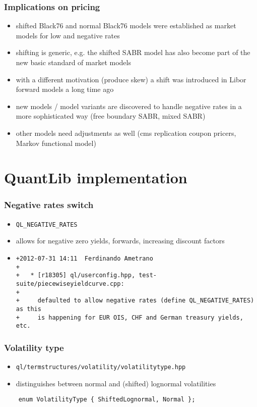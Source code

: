 \documentclass{beamer}
\begin{document}
\begin{frame}[fragile]
\frametitle{Implications on pricing}
\begin{itemize}
\item shifted Black76 and normal Black76 models were established as market models for low and negative rates
\item shifting is generic, e.g. the shifted SABR model has also become part of the new basic standard of market models
\item with a different motivation (produce skew) a shift was introduced in Libor forward models a long time ago
\item new models / model variants are discovered to handle negative rates in a more sophisticated way (free boundary SABR, mixed SABR)
\item other models need adjustments as well (cms replication coupon pricers, Markov functional model)
\end{itemize}
\end{frame}

\section{QuantLib implementation}

\begin{frame}[fragile]
\frametitle{Negative rates switch}
\begin{itemize}
\item \verb+QL_NEGATIVE_RATES+
\item allows for negative zero yields, forwards, increasing discount factors
\item \scriptsize \begin{verbatim}
+2012-07-31 14:11  Ferdinando Ametrano
+
+	* [r18305] ql/userconfig.hpp, test-suite/piecewiseyieldcurve.cpp:
+
+     defaulted to allow negative rates (define QL_NEGATIVE_RATES) as this
+     is happening for EUR OIS, CHF and German treasury yields, etc.
\end{verbatim}
\end{itemize}
\end{frame}


\begin{frame}[fragile]
\frametitle{Volatility type}
\begin{itemize}
\item \verb+ql/termstructures/volatility/volatilitytype.hpp+
\item distinguishes between normal and (shifted) lognormal volatilities
\end{itemize}
\begin{verbatim}
    enum VolatilityType { ShiftedLognormal, Normal };
\end{verbatim}
\end{frame}
\end{document}
